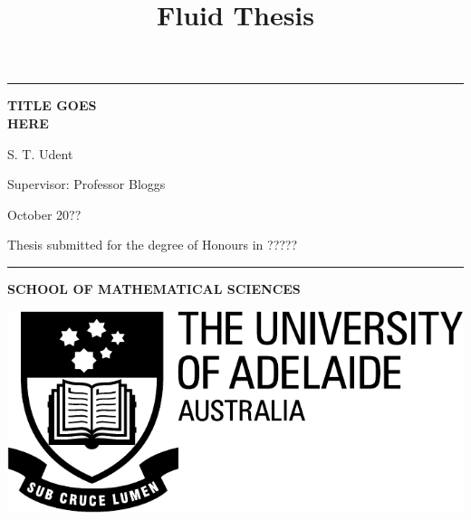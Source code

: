 \documentclass{X:/Documents/Coding/Latex/myreport}
\title{Fluid Thesis}
\theoremstyle{plain}
\theoremstyle{definition}
\theoremstyle{remark}
\numberwithin{equation}{section}
\numberwithin{figure}{section}
\begin{document}
%
%
\begin{titlepage}
\begin{flushleft}
\hrule
\vspace{1 cm}


{\huge{\bf TITLE GOES \\[15pt] HERE}}
\vspace*{2cm}




\vspace{1 cm}
{\large S. T. Udent}

\vspace{0.5 cm}

{\large Supervisor: Professor Bloggs}

\vspace{0.5 cm}

{October 20??}

\vspace{2.5 cm}

{ Thesis submitted for the degree of Honours in ?????}



\vspace{10 cm}


\hrule


\end{flushleft}
\begin{flushleft}
\textbf{\textsf{SCHOOL OF MATHEMATICAL SCIENCES}}
\end{flushleft}


\vspace{-1cm}
%
%

%
\begin{flushright}
\includegraphics[scale=0.25]{ua_crest.pdf}
\end{flushright}
\vspace{-2 cm}

\end{titlepage}
\end{document}
